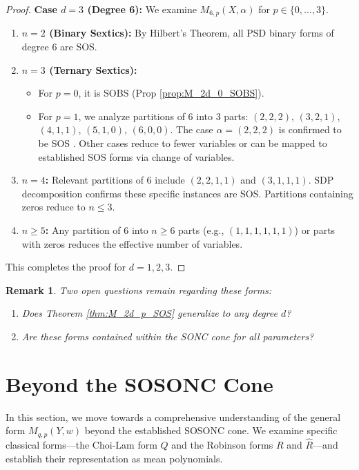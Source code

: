 \documentclass{article}
\newtheorem{remark}{Remark}
\begin{document}
\begin{proof}
\noindent \textbf{Case $d=3$ (Degree 6):}
We examine $M_{6,p}(X, \alpha)$ for $p \in \{0, \dots, 3\}$.
\begin{enumerate}
    \item \textbf{$n=2$ (Binary Sextics):} By Hilbert's Theorem, all PSD binary forms of degree 6 are SOS.
    \item \textbf{$n=3$ (Ternary Sextics):}
    \begin{itemize}
        \item For $p=0$, it is SOBS (Prop \ref{prop:M_2d_0_SOBS}).
        \item For $p=1$, we analyze partitions of 6 into 3 parts: $(2,2,2)$, $(3,2,1)$, $(4,1,1)$, $(5,1,0)$, $(6,0,0)$.
        The case $\alpha=(2,2,2)$ is confirmed to be SOS \cite{GMIr}. Other cases reduce to fewer variables or can be mapped to
        established SOS forms via change of variables.
    \end{itemize}
    \item \textbf{$n=4$:}
    Relevant partitions of 6 include $(2,2,1,1)$ and $(3,1,1,1)$. SDP decomposition confirms these specific instances are SOS. 
    Partitions containing zeros reduce to $n \leq 3$.
    \item \textbf{$n \geq 5$:}
    Any partition of 6 into $n \ge 6$ parts (e.g., $(1,1,1,1,1,1)$) or parts with zeros reduces the effective number of 
    variables.
\end{enumerate}
This completes the proof for $d=1, 2, 3$.
\end{proof}

\begin{remark}
Two open questions remain regarding these forms:
\begin{enumerate}
    \item Does Theorem \ref{thm:M_2d_p_SOS} generalize to any degree $d$?
    \item Are these forms contained within the SONC cone for all parameters?
\end{enumerate}
\end{remark}

\section{Beyond the SOSONC Cone}
\label{s05}

In this section, we move towards a comprehensive understanding of the general form $M_{q,p}(Y,w)$ beyond the established 
SOSONC cone. We examine specific classical forms—the Choi-Lam form $Q$ and the Robinson forms $R$ and $\hat{R}$—and 
establish their representation as mean polynomials.
\end{document}
